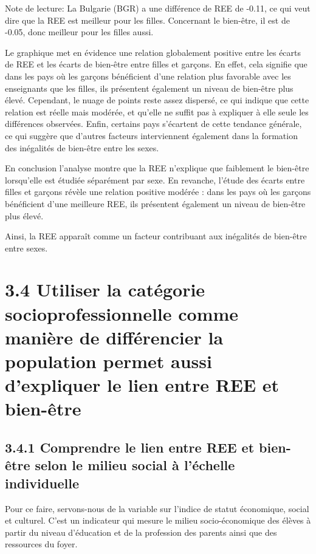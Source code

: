 \documentclass[
  french,
  11pt,
  a4paper,
  oneside]{report}
\begin{document}
Note de lecture: La Bulgarie (BGR) a une différence de REE de -0.11, ce
qui veut dire que la REE est meilleur pour les filles. Concernant le
bien-être, il est de -0.05, donc meilleur pour les filles aussi.

Le graphique met en évidence une relation globalement positive entre les
écarts de REE et les écarts de bien-être entre filles et garçons. En
effet, cela signifie que dans les pays où les garçons bénéficient d'une
relation plus favorable avec les enseignants que les filles, ils
présentent également un niveau de bien-être plus élevé. Cependant, le
nuage de points reste assez dispersé, ce qui indique que cette relation
est réelle mais modérée, et qu'elle ne suffit pas à expliquer à elle
seule les différences observées. Enfin, certains pays s'écartent de
cette tendance générale, ce qui suggère que d'autres facteurs
interviennent également dans la formation des inégalités de bien-être
entre les sexes.

En conclusion l'analyse montre que la REE n'explique que faiblement le
bien-être lorsqu'elle est étudiée séparément par sexe. En revanche,
l'étude des écarts entre filles et garçons révèle une relation positive
modérée : dans les pays où les garçons bénéficient d'une meilleure REE,
ils présentent également un niveau de bien-être plus élevé.

Ainsi, la REE apparaît comme un facteur contribuant aux inégalités de
bien-être entre sexes.

\section{3.4 Utiliser la catégorie socioprofessionnelle comme manière de
différencier la population permet aussi d'expliquer le lien entre REE et
bien-être}\label{utiliser-la-catuxe9gorie-socioprofessionnelle-comme-maniuxe8re-de-diffuxe9rencier-la-population-permet-aussi-dexpliquer-le-lien-entre-ree-et-bien-uxeatre}

\subsection{3.4.1 Comprendre le lien entre REE et bien-être selon le
milieu social à l'échelle
individuelle}\label{comprendre-le-lien-entre-ree-et-bien-uxeatre-selon-le-milieu-social-uxe0-luxe9chelle-individuelle}

Pour ce faire, servons-nous de la variable sur l'indice de statut
économique, social et culturel. C'est un indicateur qui mesure le milieu
socio-économique des élèves à partir du niveau d'éducation et de la
profession des parents ainsi que des ressources du foyer.
\end{document}
